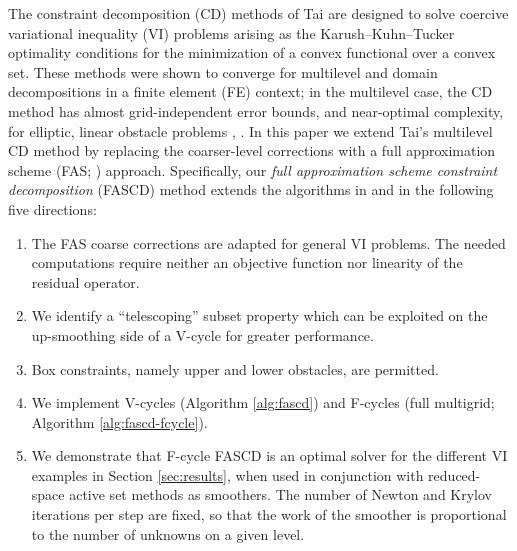 \documentclass[letterpaper,final,12pt,reqno]{amsart}
\theoremstyle{cstyle}
\theoremstyle{cstyle*}
\theoremstyle{dstyle}
\numberwithin{equation}{section}
\numberwithin{figure}{section}
\numberwithin{table}{section}
\numberwithin{theorem}{section}
\begin{document}
The constraint decomposition (CD) methods of Tai \cite{Tai2003} are designed to solve coercive variational inequality (VI) problems arising as the Karush--Kuhn--Tucker optimality conditions for the minimization of a convex functional over a convex set.  These methods were shown to converge for multilevel and domain decompositions in a finite element (FE) context; in the multilevel case, the CD method has almost grid-independent error bounds, and near-optimal complexity, for elliptic, linear obstacle problems \cite[Subsection 5.4]{Tai2003}, \cite[Theorem 4.6 and Algorithm 4.7]{GraeserKornhuber2009}.
In this paper we extend Tai's multilevel CD method by replacing the coarser-level corrections with a full approximation scheme (FAS; \cite{Brandt1977,Bruneetal2015}) approach.  Specifically, our \emph{full approximation scheme constraint decomposition} (FASCD) method extends the algorithms in \cite{GraeserKornhuber2009} and \cite{Tai2003} in the following five directions:
\renewcommand{\labelenumi}{\emph{(\roman{enumi})}}
\begin{enumerate}
\item The FAS coarse corrections are adapted for general VI problems. The needed computations require neither an objective function nor linearity of the residual operator.
\item We identify a ``telescoping'' subset property which can be exploited on the up-smoothing side of a V-cycle for greater performance.
\item Box constraints, namely upper and lower obstacles, are permitted.
\item We implement V-cycles (Algorithm \ref{alg:fascd}) and F-cycles (full multigrid; Algorithm \ref{alg:fascd-fcycle}).
\item We demonstrate that F-cycle FASCD is an optimal solver for the different VI examples in Section \ref{sec:results}, when used in conjunction with reduced-space active set methods as smoothers. The number of Newton and Krylov iterations per step are fixed, so that the work of the smoother is proportional to the number of unknowns on a given level.
\end{enumerate}
\end{document}
